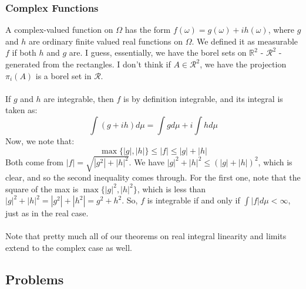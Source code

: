 \documentclass[12pt,a4paper]{article}
\newcommand{\1}[1]{\mathbbm{1}\left\{ #1 \right\}}
\newcommand{\R}{\mathbb{R}}
\newcommand{\rcal}{\mathcal{R}}
\begin{document}
\subsubsection{Complex Functions}
A complex-valued function on $\Omega$ has the form $f(\omega) = g(\omega) + ih(\omega)$, where $g$ and $h$ are ordinary finite valued real functions on $\Omega$. We defined it as measurable $f$ if both $h$ and $g$ are. I guess, essentially, we have the borel sets on $\R^2$ - $\rcal^2$ - generated from the rectangles. I don't think if $A \in \rcal^2$, we have the projection $\pi_i(A)$ is a borel set in $\rcal$.
\\\\
If $g$ and $h$ are integrable, then $f$ is by definition integrable, and its integral is taken as:
$$
	\int (g + ih) d\mu = \int g d\mu + i \int h d\mu
$$
Now, we note that:
$$
	\max\{|g|, |h|\} \leq |f| \leq |g| + |h|
$$
Both come from $|f| = \sqrt{|g^2| + |h|^2}$. We have $|g|^2 + |h|^2 \leq (|g| + |h|)^2$, which is clear, and so the second inequality comes through. For the first one, note that the square of the max is $\max\{|g|^2, |h|^2\}$, which is less than $|g|^2 + |h|^2 = |g^2| + |h^2| = g^2 + h^2$. So, $f$ is integrable if and only if $\int |f| d\mu < \infty$, just as in the real case.
\\\\
Note that pretty much all of our theorems on real integral linearity and limits extend to the complex case as well. 

\subsection{Problems}
\end{document}
